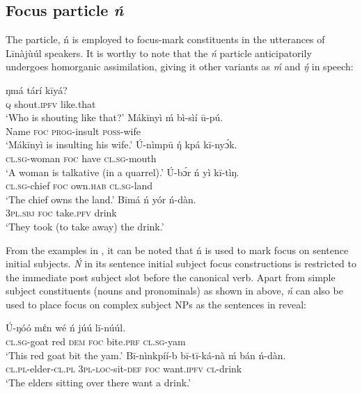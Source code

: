 \documentclass[output=paper,colorlinks,citecolor=brown]{langscibook}
\begin{document}
\subsection{Focus particle \textit{ń} }\label{sec:bisilki:5.1}

The particle, ń is employed to focus-mark constituents in the utterances of Līnàjùúl speakers. It is worthy to note that the \textit{ń} particle anticipatorily undergoes homorganic assimilation, giving it other variants as \textit{ḿ} and \textit{ŋ́ } in speech:

\ea%
    \label{ex:bisilki:8}
    \ea\label{ex:bisilki:8a}
        \ea\label{ex:bisilki:8ai}
        \gll    ŋmá	tárí		kīyá?\\
                \textsc{q}	shout\textsc{.ipfv}	like.that\\
        \glt    ‘Who is shouting like that?’
        \ex\label{ex:bisilki:8aii}
        \gll    Mákīnyì	ḿ	bì-sìí		ū-pú.\\
                Name		\textsc{foc}	\textsc{prog-}insult	\textsc{poss-}wife\\
        \glt    ‘Mákīnyì is insulting his wife.’
        \z
    \ex\label{ex:bisilki:8b}
    \gll    Ú-nìmpū		ŋ́	kpá	kī-nyɔ́k.\\
            \textsc{cl.sg-}woman	\textsc{foc}	have	\textsc{cl.sg-}mouth\\
    \glt    ‘A woman is talkative (in a quarrel).’
    \ex\label{ex:bisilki:8c}
    \gll    Ú-bɔ́r		ń	yì		kī-tìŋ.\\
            \textsc{cl.sg-}chief	\textsc{foc}	own\textsc{.hab}	\textsc{cl.sg-}land\\
    \glt    ‘The chief owns the land.’
    \ex\label{ex:bisilki:8d}
    \gll    Bīmá		ń	yór		ń-dàn.\\
            \textsc{3pl.sbj}	\textsc{foc}	take\textsc{.pfv}	drink\\
    \glt    ‘They took (to take away) the drink.’
    \z
\z

From the examples in , it can be noted that ń is used to mark focus on sentence initial subjects. \textit{Ń} in its sentence initial subject focus constructions is restricted to the immediate post subject slot before the canonical verb. Apart from simple subject constituents (nouns and pronominals) as shown in  above,\textit{ ń} can also be used to place focus on complex subject NPs as the sentences in  reveal:

\ea%
    \label{ex:bisilki:9}
    \ea\label{ex:bisilki:9a}
    \gll    Ú-ŋóó	mέn		wé	ń	júú		lī-núúl.\\
            \textsc{cl.sg-}goat	red	\textsc{dem}	\textsc{foc}	bite\textsc{.prf}	\textsc{cl.sg-}yam\\
    \glt    ‘This red goat bit the yam.’
    \ex\label{ex:bisilki:9b}
    \gll    Bī-nìnkpíí-b	         bī-tī-ká-nà	    ḿ           bán	 ń-dàn.\\
            \textsc{cl.pl-}elder\textsc{-cl.pl}   \textsc{3pl-loc-}sit\textsc{-def}	   \textsc{foc}	      want\textsc{.ipfv}	 \textsc{cl-}drink\\
    \glt    ‘The elders sitting over there want a drink.’
    \z
\z
\end{document}

